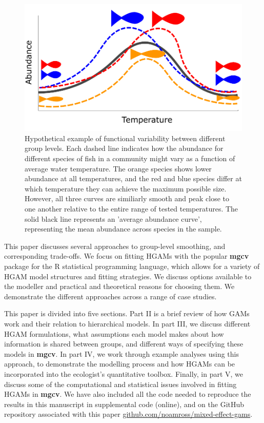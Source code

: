 \documentclass[12pt]{article}
\begin{document}
\begin{figure}

{\centering \includegraphics[width=.6\linewidth]{../figures/temp_growth_example} 

}

\caption{\label{fig:fish_size}Hypothetical example of functional variability between different group levels. Each dashed line indicates how the abundance for different species of fish in a community might vary as a function of average water temperature. The orange species shows lower abundance at all temperatures, and the red and blue species differ at which temperature they can achieve the maximum possible size. However, all three curves are similiarly smooth and peak close to one another relative to the entire range of tested temperatures. The solid black line represents an 'average abundance curve', representing the mean abundance across species in the sample.}\label{fig:fish_size}
\end{figure}

This paper discusses several approaches to group-level smoothing, and
corresponding trade-offs. We focus on fitting HGAMs with the popular
\textbf{mgcv} package for the R statistical programming language, which
allows for a variety of HGAM model structures and fitting strategies. We
discuss options available to the modeller and practical and theoretical
reasons for choosing them. We demonstrate the different approaches
across a range of case studies.

This paper is divided into five sections. Part II is a brief review of
how GAMs work and their relation to hierarchical models. In part III, we
discuss different HGAM formulations, what assumptions each model makes
about how information is shared between groups, and different ways of
specifying these models in \textbf{mgcv}. In part IV, we work through
example analyses using this approach, to demonstrate the modelling
process and how HGAMs can be incorporated into the ecologist's
quantitative toolbox. Finally, in part V, we discuss some of the
computational and statistical issues involved in fitting HGAMs in
\textbf{mgcv}. We have also included all the code needed to reproduce
the results in this manuscript in supplemental code (online), and on the
GitHub repository associated with this paper
\href{http://www.github.com/noamross/mixed-effect-gams}{github.com/noamross/mixed-effect-gams}.
\end{document}
